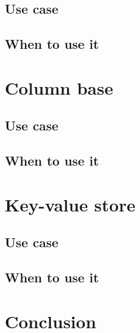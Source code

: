 \documentclass{CRPITStyle}
\begin{document}
\subsection{Use case}

\subsection{When to use it}

\section{Column base}

\subsection{Use case}

\subsection{When to use it}

\section{Key-value store}

\subsection{Use case}

\subsection{When to use it}

\section{Conclusion}




\end{document}
